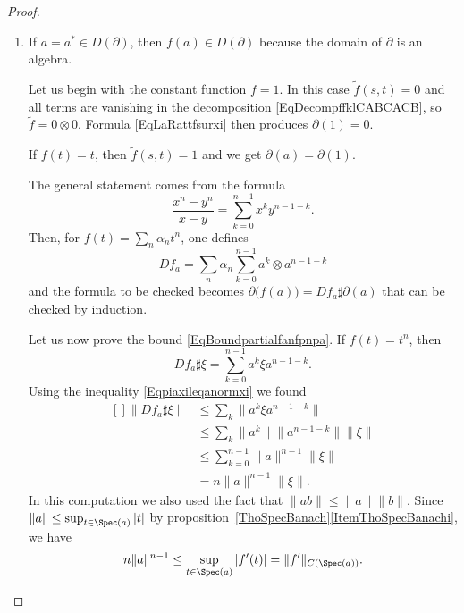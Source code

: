 \begin{proof}
    \begin{enumerate}
        \item
            If \(a=a^*\in D(\partial)\), then \(f(a)\in D(\partial)\) because the domain of \(\partial\) is an algebra.

            Let us begin with the constant function \(f=1\). In this case \(\tilde f(s,t)=0\) and all terms are vanishing in the decomposition \eqref{EqDecompffklCABCACB}, so \(\tilde f=0\otimes 0\). Formula \eqref{EqLaRattfsurxi} then produces \(\partial(1)=0\).

            If \(f(t)=t\), then \(\tilde f(s,t)=1\) and we get \(\partial(a)=\partial(1)\).

            The general statement comes from the formula
            \begin{equation}
                \frac{ x^n-y^n }{ x-y }=\sum_{k=0}^{n-1} x^ky^{n-1-k}.
            \end{equation}
            Then, for \(f(t)=\sum_n\alpha_n t^n\), one defines
            \begin{equation}
                Df_a=\sum_n \alpha_n\sum_{k=0}^{n-1}  a^k\otimes a^{n-1-k}
            \end{equation}
            and the formula to be checked becomes \(\partial\big( f(a) \big)=Df_a\sharp\partial(a)\) that can be checked by induction.

            Let us now prove the bound \eqref{EqBoundpartialfanfpnpa}. If \(f(t)=t^n\), then
            \begin{equation}
                Df_a\sharp\xi=\sum_{k=0}^{n-1}a^k\xi a^{n-1-k}.
            \end{equation}
            Using the inequality \eqref{Eqpiaxileqanormxi} we found
            \begin{equation}
                \begin{aligned}[]
                    \| Df_a\sharp\xi \| &\leq\sum_k\| a^k\xi a^{n-1-k} \|\\
                    &\leq\sum_k \| a^k \|\| a^{n-1-k} \|\| \xi \|\\
                    &\leq\sum_{k=0}^{n-1}\| a \|^{n-1}\| \xi \|\\
                    &=n\| a \|^{n-1}\| \xi \|.
                \end{aligned}
            \end{equation}
            In this computation we also used the fact that \(  \| ab \|\leq \| a \|\| b \|\). Since \(\| a \|\leq\sup_{t\in\Spec(a)}| t |\) by proposition~\ref{ThoSpecBanach}\ref{ItemThoSpecBanachi}, we have
            \begin{equation}
                n\| a \|^{n-1}\leq\sup_{t\in\Spec(a)}| f'(t) |=\| f' \|_{C( \Spec(a) )}.
            \end{equation}


\end{enumerate}
\end{proof}
